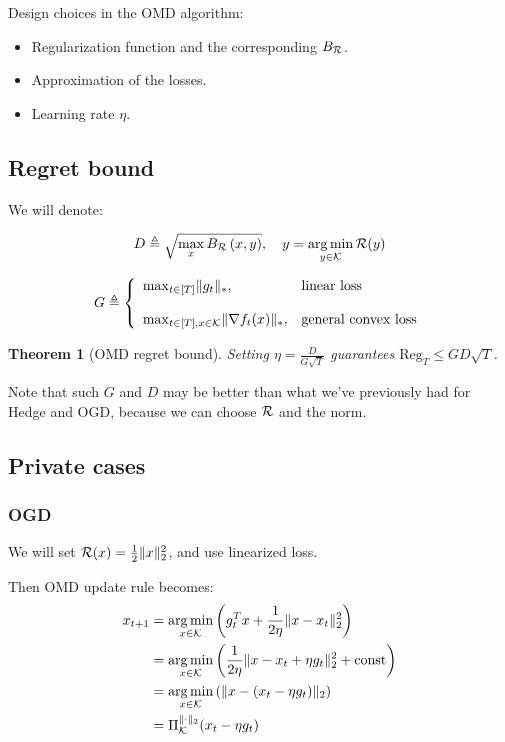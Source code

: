 \documentclass[11pt]{article}
\newtheorem{theorem}{Theorem}[section]
\theoremstyle{definition}
\theoremstyle{definition}
\newcommand{\pth}[1]{\left( #1\right)}                 %
\newcommand{\brk}[1]{\left[ #1\right]}                 %
\newcommand{\Kset}{\ensuremath{\K}}
\renewcommand{\regret}{\ensuremath{\mathrm{{Reg}}}}
\begin{document}
Design choices in the OMD algorithm:
\begin{itemize}
\item Regularization function \R{} and the corresponding $ B_{\mathcal R}$.
\item Approximation of the losses.
\item Learning rate $\eta$.
\end{itemize}


\subsection{Regret bound}

We will denote:

\begin{equation*}
D \triangleq \sqrt{ \max_{x} B_\R \pth{ x, y}}, \quad y = \argmin_{y \in \Kset}{\R(y)}
\end{equation*}

\begin{equation*}
G \triangleq \mycases{\max_{t \in \brk{T}} \norm{g_t}_* }{\text{linear loss}}{\max_{t \in \brk{T}, x \in \Kset} \norm{ \nabla f_t(x) }_* }{\text{general convex loss}}
\end{equation*}

\begin{theorem}[OMD regret bound]
Setting $ \eta = \frac{D}{G \sqrt{T}} $ guarantees $ \regret_T \leq G D \sqrt{T}$.
\end{theorem}

Note that such $G$ and $D$ may be better than what we've previously had for Hedge and OGD, because we can choose $\mathcal R$ and the norm.


\subsection{Private cases}

\subsubsection{OGD}

We will set $ \mathcal R(x) = \frac{1}{2} \mathopen\| x \mathclose\|_2^2 $, and use linearized loss.

Then OMD update rule becomes:
\begin{equation*}
\begin{aligned}
x_{t+1}
&= \argmin_{x \in \Kset} \pth{ g_t^T x + \frac{1}{2 \eta} \norm{x - x_t}_2^2 }
\\&= \argmin_{x \in \Kset} \pth{ \frac{1}{2 \eta} \norm{x - x_t + \eta g_t}_2^2 + \text{const} }
\\&= \argmin_{x \in \Kset} \pth{ \norm{x - (x_t - \eta g_t)}_2 }
\\&= \Pi_\Kset^{\norm{\cdot}_2} (x_t - \eta g_t)
\end{aligned}
\end{equation*}
\end{document}
